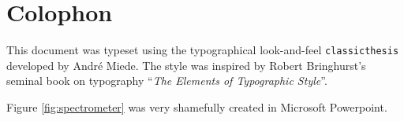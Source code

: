 \chapter{Colophon} \label{appx:colophon}

This document was typeset using the typographical look-and-feel \texttt{classicthesis} developed by Andr\'e Miede.
The style was inspired by Robert Bringhurst's seminal book on typography ``\emph{The Elements of Typographic Style}''.






Figure \ref{fig:spectrometer} was very shamefully created in Microsoft Powerpoint.